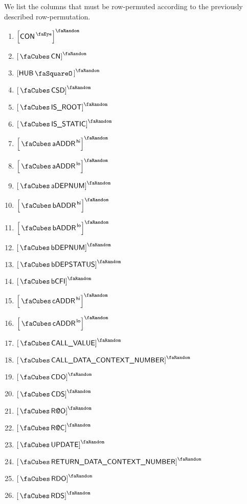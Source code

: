 We list the columns that must be row-permuted according to the previously described row-permutation.
\begin{multicols}{3}
	\begin{enumerate}
		\item $\order{\peekContext}$
		\item $\order{\cnCn}$
		\item $\order{\hubStamp}$
		\item $\order{\cnCsd}$
		\item $\order{\cnIsRootContext}$
		\item $\order{\cnStatic}$
		\item $\order{\cnAccountAddress\high}$
		\item $\order{\cnAccountAddress\low}$
		\item $\order{\cnAccDepNum}$
		\item $\order{\cnCodeAddress\high}$
		\item $\order{\cnCodeAddress\low}$
		\item $\order{\cnCodeDepNum}$
		\item $\order{\cnCodeDepStatus}$
		\item $\order{\cnCodeCfi}$
		\item $\order{\cnCallerAddress\high}$
		\item $\order{\cnCallerAddress\low}$
		\item $\order{\cnCallValue}$
		\item $\order{\cnCallDataContextNumber}$
		\item $\order{\cnCdo}$
		\item $\order{\cnCds}$
		\item $\order{\cnRao}$
		\item $\order{\cnRac}$
		\item $\order{\cnUpdate}$
		\item $\order{\cnReturner}$
		\item $\order{\cnRdo}$
		\item $\order{\cnRds}$
	\end{enumerate}
\end{multicols}
